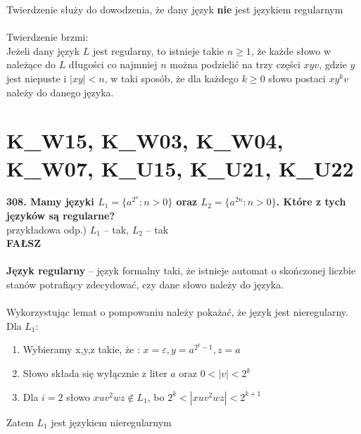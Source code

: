 Twierdzenie służy do dowodzenia, że dany język \textbf{nie} jest językiem regularnym\\\\
Twierdzenie brzmi:\\
Jeżeli dany język $L$ jest regularny, to istnieje takie $n \geq 1$, że każde słowo w należące do $L$ długości co najmniej $n$ można podzielić na trzy części $xyv$, gdzie $y$ jest niepuste i $|xy| < n$, w taki sposób, że dla każdego $k \geq 0$ słowo postaci $xy^kv$ należy do danego języka.
\\



\section{K\_W15, K\_W03, K\_W04, K\_W07, K\_U15, K\_U21, K\_U22}
\textbf{308. Mamy języki $L_1 = \{ a^{2^n} : n > 0\}$ oraz $L_2 = \{ a^{2n} : n > 0\}$. Które z tych języków są regularne? }\\
przykładowa odp.) $L_1$ -- tak, $L_2$ -- tak\\
\textbf{FAŁSZ}\\\\

\textbf{Język regularny} -- język formalny taki, że istnieje automat o skończonej liczbie stanów potrafiący zdecydować, czy dane słowo należy do języka.\\\\

Wykorzystując lemat o pompowaniu należy pokażać, że język jest nieregularny. Dla $L_1$:\\
\begin{enumerate}
\item Wybieramy x,y,z takie, że : $x=\varepsilon, y=a^{2^{k}-1}, z=a$
\item Słowo składa się wyłącznie z liter $a$ oraz $0<|v|<2^k$
\item Dla $i=2$ słowo $xuv^2wz \notin L_1 $, bo $2^k < |xuv^2wz| < 2^{k+1}$
\end{enumerate}
Zatem $L_1$ jest językiem nieregularnym

